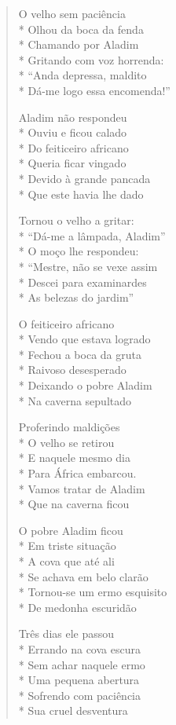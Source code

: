 \begin{verse}
O velho sem paciência\\*
Olhou da boca da fenda\\*
Chamando por Aladim\\*
Gritando com voz horrenda:\\*
``Anda depressa, maldito\\*
Dá-me logo essa encomenda!''

Aladim não respondeu\\*
Ouviu e ficou calado\\*
Do feiticeiro africano\\*
Queria ficar vingado\\*
Devido à grande pancada\\*
Que este havia lhe dado

Tornou o velho a gritar:\\*
``Dá-me a lâmpada, Aladim''\\*
O moço lhe respondeu:\\*
``Mestre, não se vexe assim\\*
Descei para examinardes\\*
As belezas do jardim''

O feiticeiro africano\\*
Vendo que estava logrado\\*
Fechou a boca da gruta\\*
Raivoso desesperado\\*
Deixando o pobre Aladim\\*
Na caverna sepultado

Proferindo maldições\\*
O velho se retirou\\*
E naquele mesmo dia\\*
Para África embarcou.\\*
Vamos tratar de Aladim\\*
Que na caverna ficou

O pobre Aladim ficou\\*
Em triste situação\\*
A cova que até ali\\*
Se achava em belo clarão\\*
Tornou-se um ermo esquisito\\*
De medonha escuridão

Três dias ele passou\\*
Errando na cova escura\\*
Sem achar naquele ermo\\*
Uma pequena abertura\\*
Sofrendo com paciência\\*
Sua cruel desventura


\end{verse}
